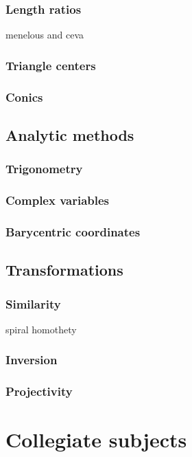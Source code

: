 \documentclass{../../large}
\begin{document}
\section{Length ratios}
menelous and ceva

\section{Triangle centers}

\section{Conics}



\chapter{Analytic methods}
\section{Trigonometry}
\section{Complex variables}
\section{Barycentric coordinates}



\chapter{Transformations}
\section{Similarity}
spiral homothety

\section{Inversion}

\section{Projectivity}




\part{Collegiate subjects}
\end{document}
